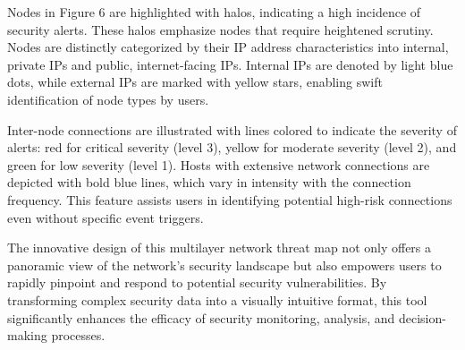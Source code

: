 Nodes in Figure 6 are highlighted with halos, indicating a high incidence of security alerts. These halos emphasize nodes that require heightened scrutiny. Nodes are distinctly categorized by their IP address characteristics into internal, private IPs and public, internet-facing IPs. Internal IPs are denoted by light blue dots, while external IPs are marked with yellow stars, enabling swift identification of node types by users.

Inter-node connections are illustrated with lines colored to indicate the severity of alerts: red for critical severity (level 3), yellow for moderate severity (level 2), and green for low severity (level 1). Hosts with extensive network connections are depicted with bold blue lines, which vary in intensity with the connection frequency. This feature assists users in identifying potential high-risk connections even without specific event triggers.

The innovative design of this multilayer network threat map not only offers a panoramic view of the network's security landscape but also empowers users to rapidly pinpoint and respond to potential security vulnerabilities. By transforming complex security data into a visually intuitive format, this tool significantly enhances the efficacy of security monitoring, analysis, and decision-making processes.




